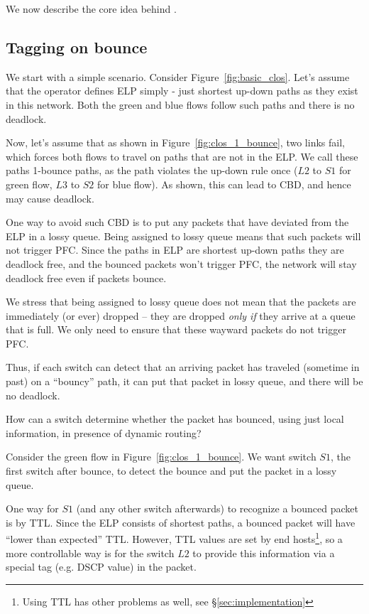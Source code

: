 We now describe the core idea behind \sysname{}.

\subsection{Tagging on bounce}
\label{subsec:tag}

We start with a simple scenario. Consider Figure~\ref{fig:basic_clos}. Let's
assume that the operator defines ELP simply - just shortest up-down paths as
they exist in this network.  Both the green and blue flows follow such paths and
there is no deadlock.

Now, let's assume that as shown in Figure~\ref{fig:clos_1_bounce}, two links
fail, which forces both flows to travel on paths that are not in the ELP. We
call these paths 1-bounce paths, as the path violates the up-down rule once
($L2$ to $S1$ for green flow, $L3$ to $S2$ for blue flow). As shown, this can
lead to CBD, and hence may cause deadlock.

One way to avoid such CBD is to put any packets that have deviated from the ELP
 in a lossy queue.  Being assigned to lossy queue means that such packets
will not trigger PFC. Since the paths in ELP are shortest up-down paths they are
deadlock free, and the bounced packets won't trigger PFC, the network will stay
deadlock free even if packets bounce.

We stress that being assigned to lossy queue does not mean that the packets are
immediately (or ever) dropped -- they are dropped {\em only if} they arrive at a
queue that is full. We only need to ensure that these wayward packets do not trigger
PFC.

Thus, if each switch can detect that an arriving packet has traveled (sometime
in past) on a ``bouncy'' path, it can put that packet in lossy queue, and there
will be no deadlock.

How can a switch determine whether the packet has bounced, using just local
information, in presence of dynamic routing?

Consider the green flow in Figure~\ref{fig:clos_1_bounce}.  We want switch $S1$,
the first switch after bounce, to detect the bounce and put the packet in a
lossy queue.

One way for $S1$ (and any other switch afterwards) to recognize a bounced packet
is by TTL. Since the ELP consists of shortest paths, a bounced packet will have
``lower than expected'' TTL. However, TTL values are set by end
hosts\footnote{Using TTL has other problems as well, see \S\ref{sec:implementation}}, so a
more controllable way is for the switch $L2$ to provide this information via a
special tag (e.g. DSCP value) in the packet. 

